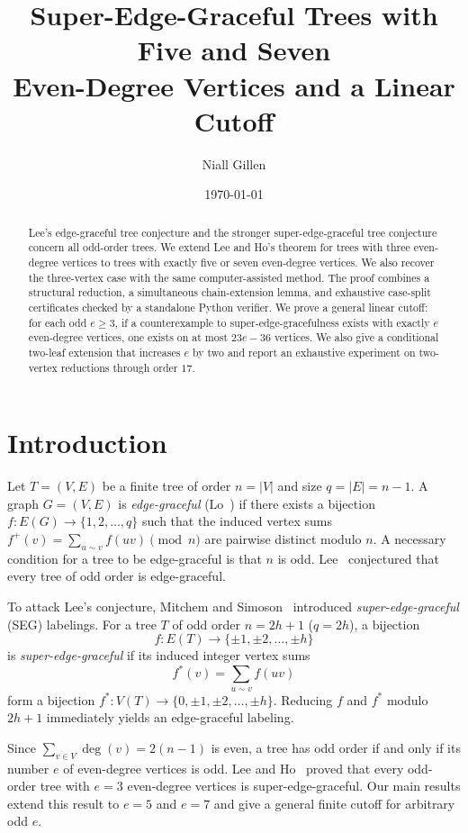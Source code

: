 \documentclass[11pt]{article}
\title{Super-Edge-Graceful Trees with Five and Seven\\
Even-Degree Vertices and a Linear Cutoff}
\author{Niall Gillen}
\date{\today}
\theoremstyle{definition}
\begin{document}
\maketitle

\begin{abstract}
Lee's edge-graceful tree conjecture and the stronger super-edge-graceful tree conjecture concern all odd-order trees. We extend Lee and Ho's theorem for trees with three even-degree vertices to trees with exactly five or seven even-degree vertices. We also recover the three-vertex case with the same computer-assisted method. The proof combines a structural reduction, a simultaneous chain-extension lemma, and exhaustive case-split certificates checked by a standalone Python verifier. We prove a general linear cutoff: for each odd $e \ge 3$, if a counterexample to super-edge-gracefulness exists with exactly $e$ even-degree vertices, one exists on at most $23e-36$ vertices. We also give a conditional two-leaf extension that increases $e$ by two and report an exhaustive experiment on two-vertex reductions through order $17$.
\end{abstract}

\section{Introduction}

Let $T = (V, E)$ be a finite tree of order $n = |V|$ and size $q = |E| = n - 1$. A graph $G = (V, E)$ is \emph{edge-graceful} (Lo~\cite{Lo1985}) if there exists a bijection $f : E(G) \to \{1, 2, \dots, q\}$ such that the induced vertex sums $f^+(v) = \sum_{u \sim v} f(uv) \pmod{n}$ are pairwise distinct modulo $n$. A necessary condition for a tree to be edge-graceful is that $n$ is odd. Lee~\cite{Lee1989} conjectured that every tree of odd order is edge-graceful.

To attack Lee's conjecture, Mitchem and Simoson~\cite{MitchemSimoson1994} introduced \emph{super-edge-graceful} (SEG) labelings. For a tree $T$ of odd order $n = 2h + 1$ ($q = 2h$), a bijection
\[
f : E(T) \longrightarrow \{\pm 1, \pm 2, \dots, \pm h\}
\]
is \emph{super-edge-graceful} if its induced integer vertex sums
\[
f^*(v) = \sum_{u \sim v} f(uv)
\]
form a bijection $f^* : V(T) \to \{0, \pm 1, \pm 2, \dots, \pm h\}$. Reducing $f$ and $f^*$ modulo $2h+1$ immediately yields an edge-graceful labeling.

Since $\sum_{v \in V} \deg(v) = 2(n-1)$ is even, a tree has odd order if and only if its number $e$ of even-degree vertices is odd. Lee and Ho~\cite{LeeHo2007} proved that every odd-order tree with $e = 3$ even-degree vertices is super-edge-graceful. Our main results extend this result to $e = 5$ and $e = 7$ and give a general finite cutoff for arbitrary odd $e$.
\end{document}
